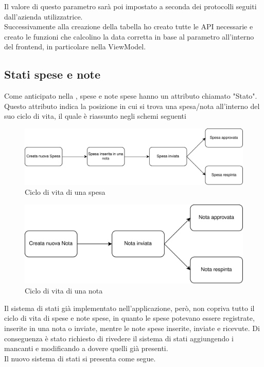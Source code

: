 \noindent Il valore di questo parametro sarà poi impostato a seconda dei protocolli seguiti dall'azienda utilizzatrice.\\
Successivamente alla creazione della tabella ho creato tutte le API necessarie e creato le funzioni che calcolino la data corretta in base al parametro all'interno del frontend, in particolare nella ViewModel.

\subsection{Stati spese e note}
\label{cap:stati}

Come anticipato nella , spese e note spese hanno un attributo chiamato "Stato". Questo attributo indica la posizione in cui si trova una spesa/nota all'interno del suo ciclo di vita, il quale è riassunto negli schemi seguenti

\begin{figure}[h!]
    \centering
    \includegraphics[width=\columnwidth]{images/SpesaLife.png}
    \caption{Ciclo di vita di una spesa}
\end{figure}

\begin{figure}[H]
    \centering
    \includegraphics[width=.8\columnwidth]{images/NotaLife.png}
    \caption{Ciclo di vita di una nota}
\end{figure}

\noindent Il sistema di stati già implementato nell'applicazione, però, non copriva tutto il ciclo di vita di spese e note spese, in quanto le spese potevano essere registrate, inserite in una nota o inviate, mentre le note spese inserite, inviate e ricevute. Di conseguenza è stato richiesto di rivedere il sistema di stati aggiungendo i mancanti e modificando a dovere quelli già presenti.\\
Il nuovo sistema di stati si presenta come segue.

